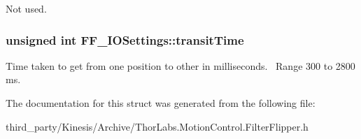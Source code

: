 Not used. 

\subsubsection[{\texorpdfstring{transit\+Time}{transitTime}}]{\setlength{\rightskip}{0pt plus 5cm}unsigned int F\+F\+\_\+\+I\+O\+Settings\+::transit\+Time}\hypertarget{struct_f_f___i_o_settings_a89e6109b780b1b53ffc2ebc74e3ec902}{}\label{struct_f_f___i_o_settings_a89e6109b780b1b53ffc2ebc74e3ec902}


Time taken to get from one position to other in milliseconds.~\newline
 Range 300 to 2800 ms. 



The documentation for this struct was generated from the following file\+:\begin{DoxyCompactItemize}
\item 
third\+\_\+party/\+Kinesis/\+Archive/Thor\+Labs.\+Motion\+Control.\+Filter\+Flipper.\+h\end{DoxyCompactItemize}
